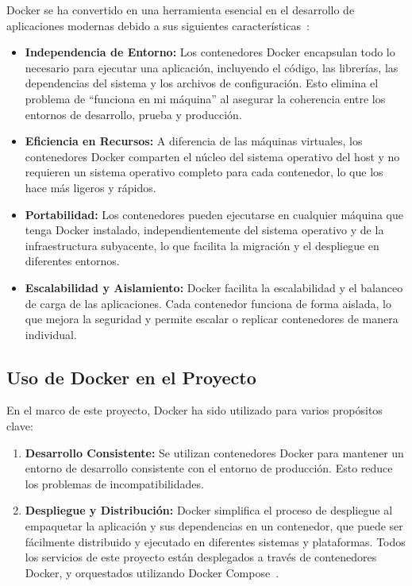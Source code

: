 Docker se ha convertido en una herramienta esencial en el desarrollo de aplicaciones modernas debido a sus siguientes características~\cite{mouat2015}:

\begin{itemize}
    \item \textbf{Independencia de Entorno:} Los contenedores Docker encapsulan todo lo necesario para ejecutar una aplicación, incluyendo el código, las librerías, las dependencias del sistema y los archivos de configuración. Esto elimina el problema de ``funciona en mi máquina'' al asegurar la coherencia entre los entornos de desarrollo, prueba y producción.

    \item \textbf{Eficiencia en Recursos:} A diferencia de las máquinas virtuales, los contenedores Docker comparten el núcleo del sistema operativo del host y no requieren un sistema operativo completo para cada contenedor, lo que los hace más ligeros y rápidos.

    \item \textbf{Portabilidad:} Los contenedores pueden ejecutarse en cualquier máquina que tenga Docker instalado, independientemente del sistema operativo y de la infraestructura subyacente, lo que facilita la migración y el despliegue en diferentes entornos.

    \item \textbf{Escalabilidad y Aislamiento:} Docker facilita la escalabilidad y el balanceo de carga de las aplicaciones. Cada contenedor funciona de forma aislada, lo que mejora la seguridad y permite escalar o replicar contenedores de manera individual.
\end{itemize}

\subsection{Uso de Docker en el Proyecto}

En el marco de este proyecto, Docker ha sido utilizado para varios propósitos clave:

\begin{enumerate}
    \item \textbf{Desarrollo Consistente:} Se utilizan contenedores Docker para mantener un entorno de desarrollo consistente con el entorno de producción. Esto reduce los problemas de incompatibilidades.
    
    \item \textbf{Despliegue y Distribución:} Docker simplifica el proceso de despliegue al empaquetar la aplicación y sus dependencias en un contenedor, que puede ser fácilmente distribuido y ejecutado en diferentes sistemas y plataformas. Todos los servicios de este proyecto están desplegados a través de contenedores Docker, y orquestados utilizando Docker Compose~\cite{dockercompose}.
\end{enumerate}

